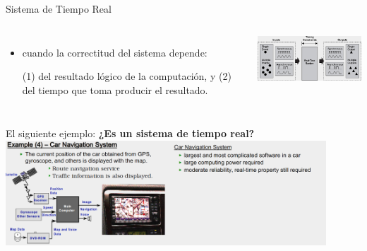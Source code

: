 \documentclass[8pt,aspectratio=169,compress]{beamer}
\begin{document}
\begin{frame}{Sistema de Tiempo Real}

   \begin{columns}[onlytextwidth,T]
     \column{\dimexpr\linewidth-70mm-5mm}

\begin{itemize}
  \item[REAL-TIME-SYSTEM] cuando la correctitud del sistema depende:

\bigskip
(1) del resultado lógico de la computación, y
\bigskip
(2) del tiempo que toma producir el resultado.

\end{itemize}

      \column{70mm}
    \includegraphics[width=70mm]{images/rts.jpg}

    \end{columns}
\bigskip
El siguiente ejemplo: \textbf{¿Es un sistema de tiempo real?}
\bigskip
    \includegraphics[width=120mm]{images/ejemplo4.jpg}

\end{frame}
\end{document}
